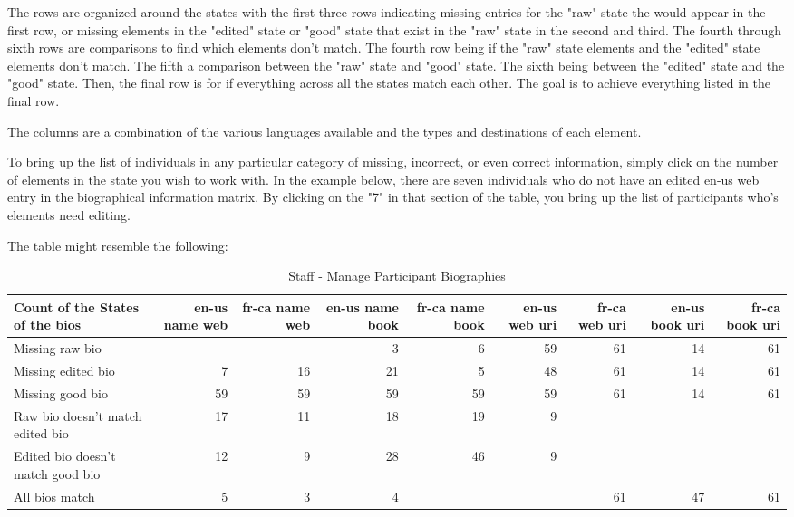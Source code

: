 \documentclass[captions=tablesignature]{scrartcl}
\begin{document}
The rows are organized around the states with the first three rows
indicating missing entries for the "raw" state the would appear in
the first row, or missing elements in the "edited" state or "good"
state that exist in the "raw" state in the second and third.  The
fourth through sixth rows are comparisons to find which elements
don't match.  The fourth row being if the "raw" state elements and
the "edited" state elements don't match. The fifth a comparison
between the "raw" state and "good" state.  The sixth being between
the "edited" state and the "good" state. Then, the final row is for
if everything across all the states match each other.  The goal is
to achieve everything listed in the final row.

The columns are a combination of the various languages available
and the types and destinations of each element.

To bring up the list of individuals in any particular category of
missing, incorrect, or even correct information, simply click on
the number of elements in the state you wish to work with.  In the
example below, there are seven individuals who do not have an
edited en-us web entry in the biographical information matrix.  By
clicking on the "7" in that section of the table, you bring up the
list of participants who's elements need editing.

The table might resemble the following:
\begin{table}[htb]
\caption{\label{tbl:staffmanageparticipantbiographies}Staff - Manage Participant Biographies}
\centering
\begin{tabular}{lrrrrrrrr}
\hline
Count of the States of the bios & en-us name web & fr-ca name web & en-us name book & fr-ca name book & en-us web uri & fr-ca web uri & en-us book uri & fr-ca book uri\\
\hline
Missing raw bio &  &  & 3 & 6 & 59 & 61 & 14 & 61\\
Missing edited bio & 7 & 16 & 21 & 5 & 48 & 61 & 14 & 61\\
Missing good bio & 59 & 59 & 59 & 59 & 59 & 61 & 14 & 61\\
Raw bio doesn't match edited bio & 17 & 11 & 18 & 19 & 9 &  &  & \\
Edited bio doesn't match good bio & 12 & 9 & 28 & 46 & 9 &  &  & \\
All bios match & 5 & 3 & 4 &  &  & 61 & 47 & 61\\
\hline
\end{tabular}
\end{table}
\end{document}
